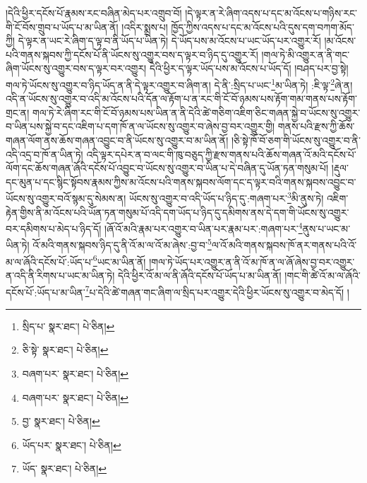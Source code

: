 །དེའི་ཕྱིར་དངོས་པོ་རྣམས་རང་བཞིན་མེད་པར་འགྲུབ་བོ། །དེ་ལྟར་ན་རེ་ཞིག་འདས་པ་དང་མ་འོངས་པ་གཉིས་རང་གི་ངོ་བོས་གྲུབ་པ་ཡོད་པ་མ་ཡིན་ནོ། །འདིར་སྨྲས་པ། ཁྱོད་ཀྱིས་འདས་པ་དང་མ་འོངས་པའི་དུས་དག་བཀག་མོད་ཀྱི། དེ་ལྟར་ན་ཡང་རེ་ཞིག་ད་ལྟ་བ་ནི་ཡོད་པ་ཡིན་ཏེ། དེ་ཡོད་པས་མ་འོངས་པ་ཡང་ཡོད་པར་འགྱུར་རོ། །མ་འོངས་པའི་གནས་སྐབས་ཀྱི་དངོས་པོ་ནི་ཡོངས་སུ་འགྱུར་བས་ད་ལྟར་བ་ཉིད་དུ་འགྱུར་རོ། །གལ་ཏེ་མི་འགྱུར་ན་ནི་གང་ཞིག་ཡོངས་སུ་འགྱུར་བས་ད་ལྟར་བར་འགྱུར། དེའི་ཕྱིར་ད་ལྟར་ཡོད་པས་མ་འོངས་པ་ཡོད་དོ། །བཤད་པར་བྱ་སྟེ། གལ་ཏེ་ཡོངས་སུ་འགྱུར་བ་ཉིད་ཡོད་ན་ནི་དེ་ལྟར་འགྱུར་བ་ཞིག་ན། དེ་ནི་:སྲིད་པ་ཡང་\footnote{སྲིད་པ་  སྣར་ཐང་།  པེ་ཅིན། }མ་ཡིན་ཏེ། :ཇི་ལྟ་\footnote{ཅི་སྟེ་  སྣར་ཐང་།  པེ་ཅིན། }ཞེ་ན། འདི་ན་ཡོངས་སུ་འགྱུར་བ་འདི་མ་འོངས་པའི་དོན་ལ་རྟོག་པ་ན་རང་གི་ངོ་བོ་ཉམས་པས་རྟོག་གམ་གནས་པས་རྟོག་གྲང་ན། གལ་ཏེ་རེ་ཞིག་རང་གི་ངོ་བོ་ཉམས་པས་ཡིན་ན་ནི་དེའི་ཚེ་གཅིག་འཇིག་ཅིང་གཞན་སྐྱེ་བ་ཡོངས་སུ་འགྱུར་བ་ཡིན་པས་སྐྱེ་བ་དང་འཇིག་པ་དག་ཁོ་ན་ལ་ཡོངས་སུ་འགྱུར་བ་ཞེས་བྱ་བར་འགྱུར་གྱི། གནས་པའི་རྫས་ཀྱི་ཆོས་གཞན་ལོག་ནས་ཆོས་གཞན་འབྱུང་བ་ནི་ཡོངས་སུ་འགྱུར་བ་མ་ཡིན་ནོ། །ཅི་སྟེ་ཁོ་བོ་ཅག་གི་ཡོངས་སུ་འགྱུར་བ་ནི་འདི་འདྲ་བ་ཁོ་ན་ཡིན་ཏེ། འདི་ལྟར་དཔེར་ན་བ་ལང་གི་ཁུ་བཅུད་ཀྱི་རྫས་གནས་པའི་ཆོས་གཞན་འོ་མའི་དངོས་པོ་ལོག་དང་ཆོས་གཞན་ཞོའི་དངོས་པོ་འབྱུང་བ་ཡོངས་སུ་འགྱུར་བ་ཡིན་པ་དེ་བཞིན་དུ་ཡོན་ཏན་གསུམ་པོ། །རྡུལ་དང་མུན་པ་དང་སྙིང་སྟོབས་རྣམས་ཀྱིས་མ་འོངས་པའི་གནས་སྐབས་ལོག་དང་ད་ལྟར་བའི་གནས་སྐབས་འབྱུང་བ་ཡོངས་སུ་འགྱུར་བའོ་སྙམ་དུ་སེམས་ན། ཡོངས་སུ་འགྱུར་བ་འདི་ཡོད་པ་ཉིད་དུ་:གཞག་པར་\footnote{བཞག་པར་  སྣར་ཐང་།  པེ་ཅིན། }མི་ནུས་ཏེ། འཇིག་རྟེན་གྱིས་ནི་མ་འོངས་པའི་ཡོན་ཏན་གསུམ་པོ་འདི་དག་ཡོད་པ་ཉིད་དུ་དམིགས་ནས་དེ་དག་གི་ཡོངས་སུ་འགྱུར་བར་དམིགས་པ་མེད་པ་ཉིད་དོ། །ཞོ་འོ་མའི་རྣམ་པར་འགྱུར་བ་ཡིན་པར་རྣམ་པར་:གཞག་པར་\footnote{བཞག་པར་  སྣར་ཐང་།  པེ་ཅིན། }ནུས་པ་ཡང་མ་ཡིན་ཏེ། འོ་མའི་གནས་སྐབས་ཉིད་དུ་ནི་འོ་མ་ལ་འོ་མ་ཞེས་:བྱ་བ་\footnote{བྱ་  སྣར་ཐང་།  པེ་ཅིན། }ལ་འོ་མའི་གནས་སྐབས་ཁོ་ནར་གནས་པའི་འོ་མ་ལ་ཞོའི་དངོས་པོ་:ཡོད་པ་\footnote{ཡོད་པར་  སྣར་ཐང་།  པེ་ཅིན། }ཡང་མ་ཡིན་ནོ། །གལ་ཏེ་ཡོད་པར་འགྱུར་ན་ནི་འོ་མ་ཁོ་ན་ལ་ཞོ་ཞེས་བྱ་བར་འགྱུར་ན་འདི་ནི་རིགས་པ་ཡང་མ་ཡིན་ཏེ། དེའི་ཕྱིར་འོ་མ་ལ་ནི་ཞོའི་དངོས་པོ་ཡོད་པ་མ་ཡིན་ནོ། །གང་གི་ཚེ་འོ་མ་ལ་ཞོའི་དངོས་པོ་:ཡོད་པ་མ་ཡིན་\footnote{ཡོད་  སྣར་ཐང་།  པེ་ཅིན། }པ་དེའི་ཚེ་གཞན་གང་ཞིག་ལ་སྲིད་པར་འགྱུར་དེའི་ཕྱིར་ཡོངས་སུ་འགྱུར་བ་མེད་དོ། །
